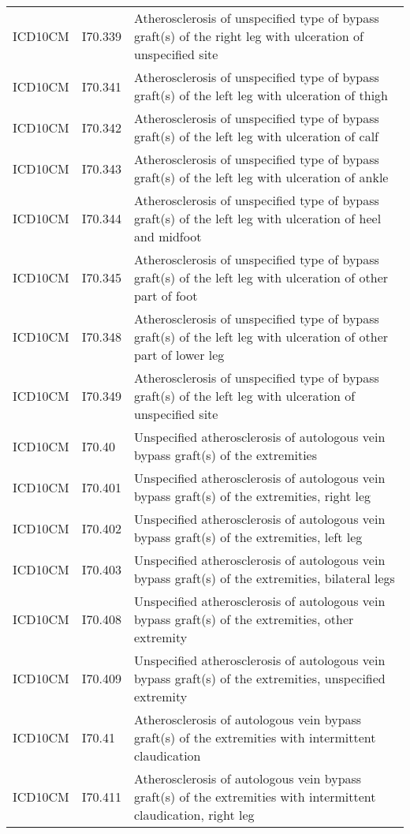 \begin{longtable}{p{}p{}p{}}
  ICD10CM & I70.339 & Atherosclerosis of unspecified type of bypass graft(s) of the right leg with ulceration of unspecified site \\ 
  ICD10CM & I70.341 & Atherosclerosis of unspecified type of bypass graft(s) of the left leg with ulceration of thigh \\ 
  ICD10CM & I70.342 & Atherosclerosis of unspecified type of bypass graft(s) of the left leg with ulceration of calf \\ 
  ICD10CM & I70.343 & Atherosclerosis of unspecified type of bypass graft(s) of the left leg with ulceration of ankle \\ 
  ICD10CM & I70.344 & Atherosclerosis of unspecified type of bypass graft(s) of the left leg with ulceration of heel and midfoot \\ 
  ICD10CM & I70.345 & Atherosclerosis of unspecified type of bypass graft(s) of the left leg with ulceration of other part of foot \\ 
  ICD10CM & I70.348 & Atherosclerosis of unspecified type of bypass graft(s) of the left leg with ulceration of other part of lower leg \\ 
  ICD10CM & I70.349 & Atherosclerosis of unspecified type of bypass graft(s) of the left leg with ulceration of unspecified site \\ 
  ICD10CM & I70.40 & Unspecified atherosclerosis of autologous vein bypass graft(s) of the extremities \\ 
  ICD10CM & I70.401 & Unspecified atherosclerosis of autologous vein bypass graft(s) of the extremities, right leg \\ 
  ICD10CM & I70.402 & Unspecified atherosclerosis of autologous vein bypass graft(s) of the extremities, left leg \\ 
  ICD10CM & I70.403 & Unspecified atherosclerosis of autologous vein bypass graft(s) of the extremities, bilateral legs \\ 
  ICD10CM & I70.408 & Unspecified atherosclerosis of autologous vein bypass graft(s) of the extremities, other extremity \\ 
  ICD10CM & I70.409 & Unspecified atherosclerosis of autologous vein bypass graft(s) of the extremities, unspecified extremity \\ 
  ICD10CM & I70.41 & Atherosclerosis of autologous vein bypass graft(s) of the extremities with intermittent claudication \\ 
  ICD10CM & I70.411 & Atherosclerosis of autologous vein bypass graft(s) of the extremities with intermittent claudication, right leg \\ 

\end{longtable}
